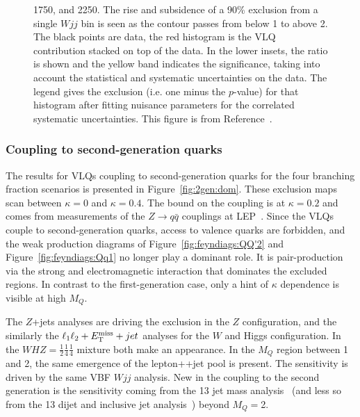 \begin{figure}[th]
{      \protect{} \unit{1750}{\GeV}, and
      \protect{} \unit{2250}{\GeV}. The rise and
      subsidence of a 90\% \CLs exclusion from a single $Wjj$ bin is seen as the
      contour passes from below \unit{1}{\TeV} to above \unit{2}{\TeV}.
      The black points are data, the red histogram is the VLQ contribution stacked on top of the data.
      In the lower insets, the ratio is shown and the yellow band indicates the significance, taking into
      account the statistical and systematic uncertainties on the data. The legend gives the exclusion
      (i.e. one minus the $p$-value)  for that histogram after fitting nuisance parameters for the correlated
      systematic uncertainties. This figure is from Reference~\cite{VLQ_contur}.}
  \label{fig:gen1:wjjscan}
\end{figure}

\subsubsection{Coupling to second-generation quarks}
The results for VLQs coupling to second-generation quarks for the four branching fraction scenarios is presented in Figure~\ref{fig:2gen:dom}. These exclusion maps scan between $\kappa=0$ and $\kappa=0.4$. The bound on the coupling is at $\kappa=0.2$ and comes from measurements of the $Z \rightarrow q\bar{q}$ couplings at LEP~\cite{Buchkremer:2013bha,ALEPH:2005ab}. Since the VLQs couple to second-generation quarks, access to valence quarks are forbidden, and the weak production diagrams of Figure~\ref{fig:feyndiags:QQ'2} and Figure~\ref{fig:feyndiags:Qq1} no longer play a dominant role. It is pair-production via the strong and electromagnetic interaction that dominates the excluded regions. In contrast to the first-generation case, only a hint of $\kappa$ dependence is visible at high $M_Q$. 

The $Z$+jets analyses are driving the exclusion in the $Z$ configuration, and the similarly the \ATLAS $\ell_1 \ell_2 + E_\mathrm{T}^\mathrm{miss}{} + jet$ analyses for the $W$ and Higgs configuration. In the $WHZ=\frac{1}{2}\frac{1}{4}\frac{1}{4}$ mixture both make an appearance. In the $M_Q$ region between \unit{1}{\TeV} and \unit{2}{\TeV}, the same emergence of the lepton+\MET{}+jet pool is present. The sensitivity is driven by the same \ATLAS VBF $Wjj$ analysis. New in the coupling to the second generation is the sensitivity coming from the \unit{13}{\TeV} \CMS jet mass analysis~\cite{Sirunyan:2018xdh} (and less so from the \ATLAS \unit{13}{\TeV} dijet and inclusive jet analysis~\cite{Aaboud:2017wsi}) beyond $M_Q=$\unit{2}{\TeV}. 

